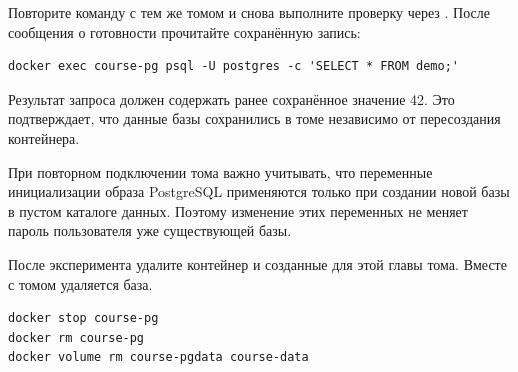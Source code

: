 Повторите команду  с тем же томом и снова выполните проверку через . После сообщения о готовности прочитайте сохранённую запись:
\par\addvspace{10pt}\noindent\begin{minipage}{\linewidth}
\begin{verbatim}
docker exec course-pg psql -U postgres -c 'SELECT * FROM demo;'
\end{verbatim}
\end{minipage}\par\addvspace{10pt}

Результат запроса должен содержать ранее сохранённое значение 42. Это подтверждает, что данные базы сохранились в томе независимо от пересоздания контейнера.

При повторном подключении тома важно учитывать, что переменные инициализации образа PostgreSQL применяются только при создании новой базы в пустом каталоге данных. Поэтому изменение этих переменных не меняет пароль пользователя уже существующей базы.

После эксперимента удалите контейнер и созданные для этой главы тома. Вместе с томом удаляется база.
\par\addvspace{10pt}\noindent\begin{minipage}{\linewidth}
\begin{verbatim}
docker stop course-pg
docker rm course-pg
docker volume rm course-pgdata course-data
\end{verbatim}
\end{minipage}\par\addvspace{10pt}

